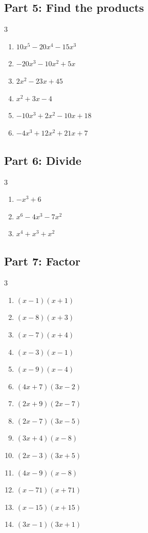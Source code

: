 \documentclass[11pt]{article}
\begin{document}
\subsection*{Part 5: Find the products}
\begin{multicols}{3}
\begin{enumerate}
  \item $10x^{5} - 20x^{4} - 15x^{3}$
  \item $-20x^{3} - 10x^{2} + 5x$
  \item $2x^{2} - 23x + 45$
  \item $x^{2} + 3x - 4$
  \item $-10x^{3} + 2x^{2} - 10x + 18$
  \item $-4x^{3} + 12x^{2} + 21x + 7$
\end{enumerate}
\end{multicols}
\subsection*{Part 6: Divide}
\begin{multicols}{3}
\begin{enumerate}
  \item $-x^{3} + 6$
  \item $x^{6} - 4x^{3} - 7x^{2}$
  \item $x^{4} + x^{3} + x^{2}$
\end{enumerate}
\end{multicols}
\subsection*{Part 7: Factor}
\begin{multicols}{3}
\begin{enumerate}
  \item $(x - 1)(x + 1)$
  \item $(x - 8)(x + 3)$
  \item $(x - 7)(x + 4)$
  \item $(x - 3)(x - 1)$
  \item $(x - 9)(x - 4)$
  \item $(4x + 7)(3x - 2)$
  \item $(2x + 9)(2x - 7)$
  \item $(2x - 7)(3x - 5)$
  \item $(3x + 4)(x - 8)$
  \item $(2x - 3)(3x + 5)$
  \item $(4x - 9)(x - 8)$
  \item $(x - 71)(x + 71)$
  \item $(x - 15)(x + 15)$
  \item $(3x - 1)(3x + 1)$
\end{enumerate}
\end{multicols}
\end{document}
